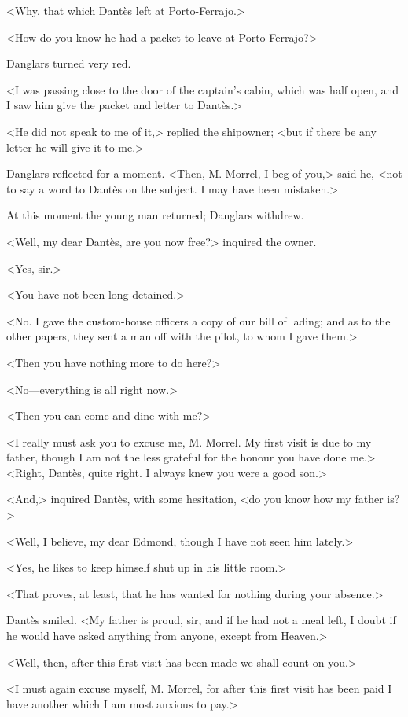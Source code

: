  <Why, that which Dantès left at Porto-Ferrajo.> 

 <How do you know he had a packet to leave at Porto-Ferrajo?> 

 Danglars turned very red. 

 <I was passing close to the door of the captain's cabin, which was half open, and I saw him give the packet and letter to Dantès.> 

 <He did not speak to me of it,> replied the shipowner; <but if there be any letter he will give it to me.> 

 Danglars reflected for a moment. <Then, M. Morrel, I beg of you,> said he, <not to say a word to Dantès on the subject. I may have been mistaken.> 

 At this moment the young man returned; Danglars withdrew. 

 <Well, my dear Dantès, are you now free?> inquired the owner. 

 <Yes, sir.> 

 <You have not been long detained.> 

 <No. I gave the custom-house officers a copy of our bill of lading; and as to the other papers, they sent a man off with the pilot, to whom I gave them.> 

 <Then you have nothing more to do here?> 

 <No—everything is all right now.> 

 <Then you can come and dine with me?> 

 <I really must ask you to excuse me, M. Morrel. My first visit is due to my father, though I am not the less grateful for the honour you have done me.>  <Right, Dantès, quite right. I always knew you were a good son.> 

 <And,> inquired Dantès, with some hesitation, <do you know how my father is?> 

 <Well, I believe, my dear Edmond, though I have not seen him lately.> 

 <Yes, he likes to keep himself shut up in his little room.> 

 <That proves, at least, that he has wanted for nothing during your absence.> 

 Dantès smiled. <My father is proud, sir, and if he had not a meal left, I doubt if he would have asked anything from anyone, except from Heaven.> 

 <Well, then, after this first visit has been made we shall count on you.> 

 <I must again excuse myself, M. Morrel, for after this first visit has been paid I have another which I am most anxious to pay.> 

